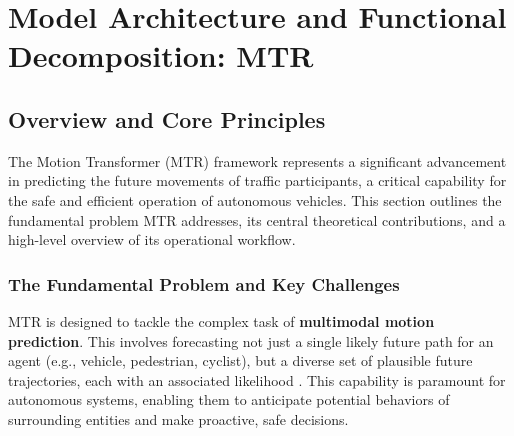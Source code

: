 \chapter{Model Architecture and Functional Decomposition: MTR}
\label{ch:model_architecture_mtr}

\section{Overview and Core Principles}
\label{sec:overview}

The Motion Transformer (MTR) framework represents a significant advancement in predicting the future movements of traffic participants, a critical capability for the safe and efficient operation of autonomous vehicles. This section outlines the fundamental problem MTR addresses, its central theoretical contributions, and a high-level overview of its operational workflow.

\subsection{The Fundamental Problem and Key Challenges}
\label{subsec:problem_challenges}

MTR is designed to tackle the complex task of \textbf{multimodal motion prediction}. This involves forecasting not just a single likely future path for an agent (e.g., vehicle, pedestrian, cyclist), but a diverse set of plausible future trajectories, each with an associated likelihood \cite{Shi2022MTR, Shi2022MTR_A}. This capability is paramount for autonomous systems, enabling them to anticipate potential behaviors of surrounding entities and make proactive, safe decisions.

